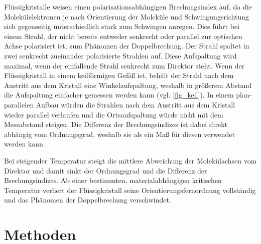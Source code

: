 \documentclass[
	a4paper,
	12pt,
	pagesize,
	ngerman
]{scrartcl}
\begin{document}
	Flüssigkristalle weisen einen polarisationsabhängigen Brechungsindex auf, da die Molekülelektronen je nach Orientierung der Moleküle und Schwingungsrichtung sich gegenseitig unterschiedlich stark zum Schwingen anregen.
	Dies führt bei einem Strahl, der nicht bereits entweder senkrecht oder parallel zur optischen Achse polarisiert ist, zum Phänomen der Doppelbrechung.
	Der Strahl spaltet in zwei senkrecht zueinander polarisierte Strahlen auf.
	Diese Aufspaltung wird maximal, wenn der einfallende Strahl senkrecht zum Direktor steht.
	Wenn der Flüssigkristall in einem keilförmigen Gefäß ist, behält der Strahl nach dem Austritt aus dem Kristall eine Winkelaufspaltung, weshalb in größerem Abstand die Aufspaltung einfacher gemessen werden kann (vgl. \cref{fig_keil}).
	In einem plan-parallelen Aufbau würden die Strahlen nach dem Austritt aus dem Kristall wieder parallel verlaufen und die Ortsaufspaltung würde nicht mit dem Messabstand steigen.
  Die Differenz der Brechungsindizes ist dabei direkt abhängig vom Ordnungsgrad, weshalb sie als ein Maß für diesen verwendet werden kann.

	Bei steigender Temperatur steigt die mittlere Abweichung der Molekülachsen vom Direktor und damit sinkt der Ordnungsgrad und die Differenz der Brechungsindizes.
	Ab einer bestimmten, materialabhängigen kritischen Temperatur verliert der Flüssigkristall seine Orientierungsfernordnung vollständig und das Phänomen der Doppelbrechung verschwindet.

	\section{Methoden}
\end{document}
